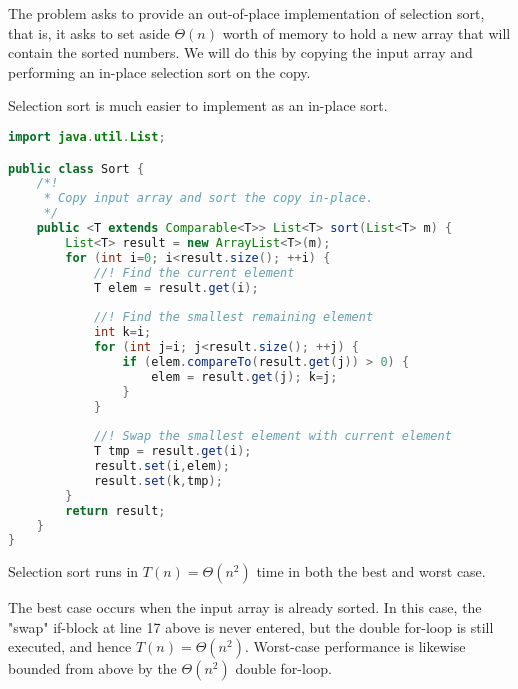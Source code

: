 \documentclass[a4paper,12pt]{article}
\begin{document}

The problem asks to provide an out-of-place implementation of selection sort, that is, it asks to set aside  
 $\Theta(n)$ worth of memory to hold a new array that will contain the sorted numbers. We will do this by 
 copying the input array and performing an in-place selection sort on the copy.
 
 Selection sort is much easier to implement as an in-place sort.

\begin{lstlisting}[language=Java]
import java.util.List;

public class Sort {
	/*!
	 * Copy input array and sort the copy in-place.
	 */
	public <T extends Comparable<T>> List<T> sort(List<T> m) {
		List<T> result = new ArrayList<T>(m);
		for (int i=0; i<result.size(); ++i) {
			//! Find the current element
			T elem = result.get(i);
			
			//! Find the smallest remaining element
			int k=i;
			for (int j=i; j<result.size(); ++j) {
				if (elem.compareTo(result.get(j)) > 0) {
					elem = result.get(j); k=j;
				}
			}
			
			//! Swap the smallest element with current element
			T tmp = result.get(i);
			result.set(i,elem);
			result.set(k,tmp);
		}
		return result;
	}
}
\end{lstlisting}

Selection sort runs in $T(n) = \Theta(n^2)$ time in both the best and worst case.

The best case occurs when the input array is already sorted. In this case, the "swap" 
if-block at line 17 above is never entered, but the double for-loop is still executed, and hence $T(n) = \Theta(n^2)$.
Worst-case performance is likewise bounded from above by the $\Theta(n^2)$ double for-loop.
\end{document}

